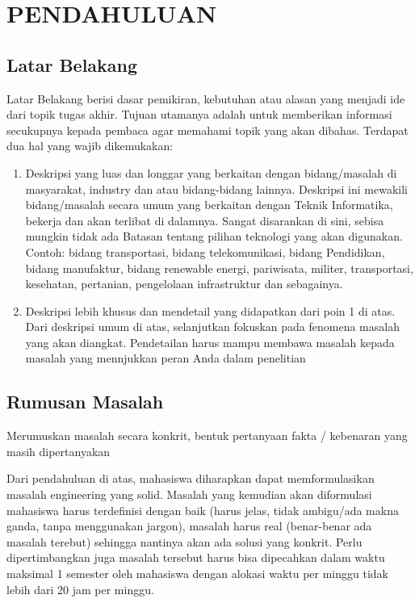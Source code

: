 \newpage
\pagestyle{fancy}
\fancyhf{}
\fancyhead[R]{\thepage}
\chapter{PENDAHULUAN} \label{Bab I}

\section{Latar Belakang} \label{I.Latar Belakang}
Latar Belakang berisi dasar pemikiran, kebutuhan atau alasan yang menjadi ide dari topik tugas akhir. Tujuan utamanya adalah untuk memberikan informasi secukupnya kepada pembaca agar memahami topik yang akan dibahas. Terdapat dua hal yang wajib dikemukakan: \par

\begin{enumerate}[noitemsep]
	\item Deskripsi yang luas dan longgar yang berkaitan dengan bidang/masalah di masyarakat, industry dan atau bidang-bidang lainnya. Deskripsi ini mewakili bidang/masalah secara umum yang berkaitan dengan Teknik Informatika, bekerja dan akan terlibat di dalamnya. Sangat disarankan di sini, sebisa mungkin tidak ada Batasan tentang pilihan teknologi yang akan digunakan. Contoh: bidang transportasi, bidang telekomunikasi, bidang Pendidikan, bidang manufaktur, bidang renewable energi, pariwisata, militer, transportasi, kesehatan, pertanian, pengelolaan infrastruktur dan sebagainya.
	\item Deskripsi lebih khusus dan mendetail yang didapatkan dari poin 1 di atas. Dari deskripsi umum di atas, selanjutkan fokuskan pada fenomena masalah yang akan diangkat. Pendetailan harus mampu membawa masalah kepada masalah yang mennjukkan peran Anda dalam penelitian 
\end{enumerate}

\section{Rumusan Masalah} \label{I.Rumusan Masalah}
Merumuskan masalah secara konkrit, bentuk pertanyaan fakta / kebenaran yang masih dipertanyakan \par

Dari pendahuluan di atas, mahasiswa diharapkan dapat memformulasikan masalah engineering yang solid. Masalah yang kemudian akan diformulasi mahasiswa harus terdefinisi dengan baik (harus jelas, tidak ambigu/ada makna ganda, tanpa menggunakan jargon), masalah harus real (benar-benar ada masalah terebut) sehingga nantinya akan ada solusi yang konkrit. Perlu dipertimbangkan juga masalah tersebut harus bisa dipecahkan dalam waktu maksimal 1 semester oleh mahasiswa dengan alokasi waktu per minggu tidak lebih dari 20 jam per minggu. \par

